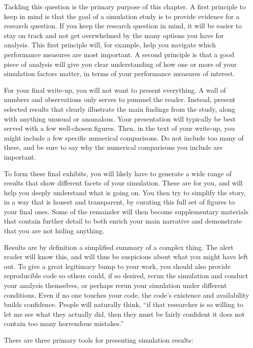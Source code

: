 \documentclass[
]{book}
\begin{document}
Tackling this question is the primary purpose of this chapter.
A first principle to keep in mind is that the goal of a simulation study is to provide evidence for a research question.
If you keep the research question in mind, it will be easier to stay on track and not get overwhelmed by the many options you have for analysis.
This first principle will, for example, help you navigate which performance measures are most important.
A second principle is that a good piece of analysis will give you clear understanding of how one or more of your simulation factors matter, in terms of your performance measures of interest.

For your final write-up, you will not want to present everything.
A wall of numbers and observations only serves to pummel the reader.
Instead, present selected results that clearly illustrate the main findings from the study, along with anything unusual or anomalous.
Your presentation will typically be best served with a few well-chosen figures.
Then, in the text of your write-up, you might include a few specific numerical comparisons.
Do not include too many of these, and be sure to say why the numerical comparisons you include are important.

To form these final exhibits, you will likely have to generate a wide range of results that show different facets of your simulation.
These are for you, and will help you deeply understand what is going on.
You then try to simplify the story, in a way that is honest and transparent, by curating this full set of figures to your final ones.
Some of the remainder will then become supplementary materials that contain further detail to both enrich your main narrative and demonstrate that you are not hiding anything.

Results are by definition a simplified summary of a complex thing.
The alert reader will know this, and will thus be suspicious about what you might have left out.
To give a great legitimacy bump to your work, you should also provide reproducible code so others could, if so desired, rerun the simulation and conduct your analysis themselves, or perhaps rerun your simulation under different conditions.
Even if no one touches your code, the code's existence and availability builds confidence.
People will naturally think, ``if that researcher is so willing to let me see what they actually did, then they must be fairly confident it does not contain too many horrendous mistakes.''

There are three primary tools for presenting simulation results:
\end{document}
